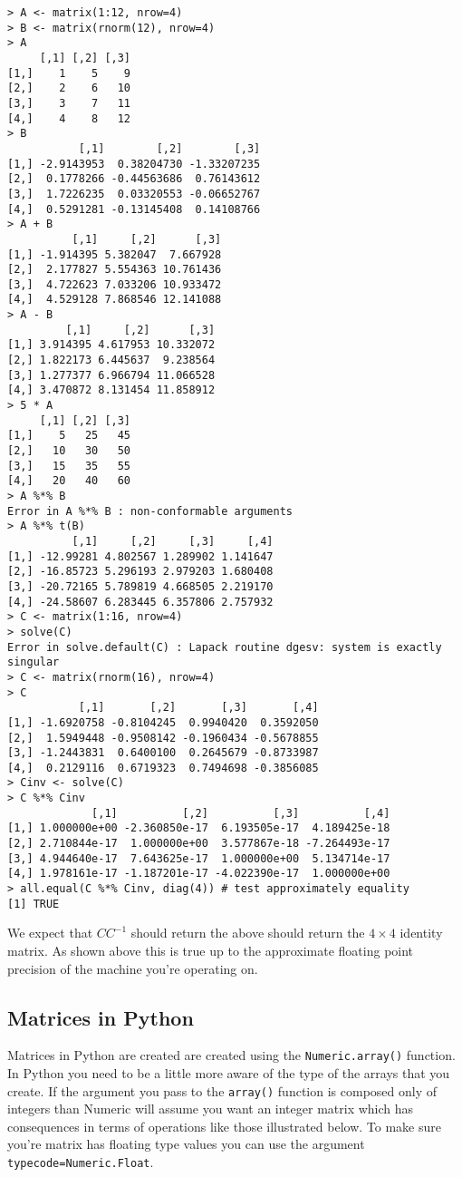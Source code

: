 \documentclass{article}
\begin{document}
\begin{lstlisting}
> A <- matrix(1:12, nrow=4)
> B <- matrix(rnorm(12), nrow=4)
> A
     [,1] [,2] [,3]
[1,]    1    5    9
[2,]    2    6   10
[3,]    3    7   11
[4,]    4    8   12
> B
           [,1]        [,2]        [,3]
[1,] -2.9143953  0.38204730 -1.33207235
[2,]  0.1778266 -0.44563686  0.76143612
[3,]  1.7226235  0.03320553 -0.06652767
[4,]  0.5291281 -0.13145408  0.14108766
> A + B
          [,1]     [,2]      [,3]
[1,] -1.914395 5.382047  7.667928
[2,]  2.177827 5.554363 10.761436
[3,]  4.722623 7.033206 10.933472
[4,]  4.529128 7.868546 12.141088
> A - B
         [,1]     [,2]      [,3]
[1,] 3.914395 4.617953 10.332072
[2,] 1.822173 6.445637  9.238564
[3,] 1.277377 6.966794 11.066528
[4,] 3.470872 8.131454 11.858912
> 5 * A
     [,1] [,2] [,3]
[1,]    5   25   45
[2,]   10   30   50
[3,]   15   35   55
[4,]   20   40   60
> A %*% B
Error in A %*% B : non-conformable arguments
> A %*% t(B)
          [,1]     [,2]     [,3]     [,4]
[1,] -12.99281 4.802567 1.289902 1.141647
[2,] -16.85723 5.296193 2.979203 1.680408
[3,] -20.72165 5.789819 4.668505 2.219170
[4,] -24.58607 6.283445 6.357806 2.757932
> C <- matrix(1:16, nrow=4)
> solve(C)
Error in solve.default(C) : Lapack routine dgesv: system is exactly singular
> C <- matrix(rnorm(16), nrow=4)
> C
           [,1]       [,2]       [,3]       [,4]
[1,] -1.6920758 -0.8104245  0.9940420  0.3592050
[2,]  1.5949448 -0.9508142 -0.1960434 -0.5678855
[3,] -1.2443831  0.6400100  0.2645679 -0.8733987
[4,]  0.2129116  0.6719323  0.7494698 -0.3856085
> Cinv <- solve(C)
> C %*% Cinv
             [,1]          [,2]          [,3]          [,4]
[1,] 1.000000e+00 -2.360850e-17  6.193505e-17  4.189425e-18
[2,] 2.710844e-17  1.000000e+00  3.577867e-18 -7.264493e-17
[3,] 4.944640e-17  7.643625e-17  1.000000e+00  5.134714e-17
[4,] 1.978161e-17 -1.187201e-17 -4.022390e-17  1.000000e+00
> all.equal(C %*% Cinv, diag(4)) # test approximately equality 
[1] TRUE
\end{lstlisting}
We expect that $CC^{-1}$ should return the above should return the
$4 \times 4$ identity matrix. As shown above this is true up to the
approximate floating point precision of the machine you're operating on.

\subsection{Matrices in Python}

Matrices in Python are created are created using the
\lstinline!Numeric.array()! function. In Python you need to be a little
more aware of the type of the arrays that you create. If the argument
you pass to the \lstinline!array()! function is composed only of
integers than Numeric will assume you want an integer matrix which has
consequences in terms of operations like those illustrated below. To
make sure you're matrix has floating type values you can use the
argument \lstinline!typecode=Numeric.Float!.
\end{document}
